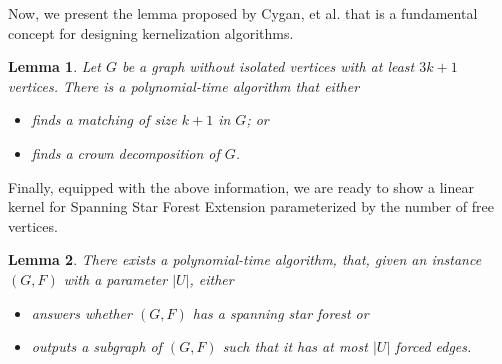\documentclass[en]{pracamgr}
\newtheorem{lemma}{Lemma}
\theoremstyle{definition}
\newcommand{\ssfep}{{\sc Spanning Star Forest Extension}}
\begin{document}
Now, we present the lemma proposed by Cygan, et al. \cite{ParAlg} %
that is a fundamental concept for designing kernelization algorithms.

\begin{lemma}
	Let $G$ be a graph without isolated vertices with at least $3k+1$ vertices. There is a polynomial-time algorithm that either
	\begin{itemize}
		\item finds a matching of size $k+1$ in $G$; or 
		\item finds a crown decomposition of $G$.
	\end{itemize} 
\end{lemma}

Finally, equipped with the above information, we are ready to show a linear kernel for \ssfep{}  parameterized by the number of free vertices.

\begin{lemma}
	There exists a polynomial-time algorithm, that, given an instance $(G,F)$ with a parameter $|U|$, either
	\begin{itemize}
		\item answers whether $(G,F)$ has a spanning star forest or
		\item outputs a subgraph of $(G,F)$ such that it has at most $|U|$ forced edges.
	\end{itemize} 
\end{lemma}
\end{document}

